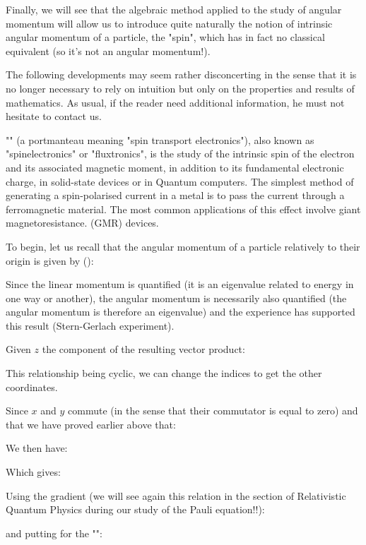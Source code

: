 	Finally, we will see that the algebraic method applied to the study of angular momentum will allow us to introduce quite naturally the notion of intrinsic angular momentum of a particle, the "spin", which has in fact no classical equivalent (so it's not an angular momentum!).

	The following developments may seem rather disconcerting in the sense that it is no longer necessary to rely on intuition but only on the properties and results of mathematics. As usual, if the reader need additional information, he must not hesitate to contact us.
	\begin{tcolorbox}[title=Remark,colframe=black,arc=10pt]
	"" (a portmanteau meaning "spin transport electronics"), also known as "spinelectronics" or "fluxtronics", is the study of the intrinsic spin of the electron and its associated magnetic moment, in addition to its fundamental electronic charge, in solid-state devices or in Quantum computers. The simplest method of generating a spin-polarised current in a metal is to pass the current through a ferromagnetic material. The most common applications of this effect involve giant magnetoresistance.  (GMR) devices. 
	\end{tcolorbox}
	To begin, let us recall that the angular momentum of a particle relatively to their origin is given by ():
	
	Since the linear momentum is quantified (it is an eigenvalue related to energy in one way or another), the angular momentum is necessarily also quantified (the angular momentum is therefore an eigenvalue) and the experience has supported this result (Stern-Gerlach experiment).

	Given $z$ the component of the resulting vector product:
	
	This relationship being cyclic, we can change the indices to get the other coordinates.

	Since $x$ and $y$ commute (in the sense that their commutator is equal to zero) and that we have proved earlier above that:
	
	We then have:
	
	Which gives:
	
	Using the gradient (we will see again this relation in the section of Relativistic Quantum Physics during our study of the Pauli equation!!):
	
	and putting for the "":
	
